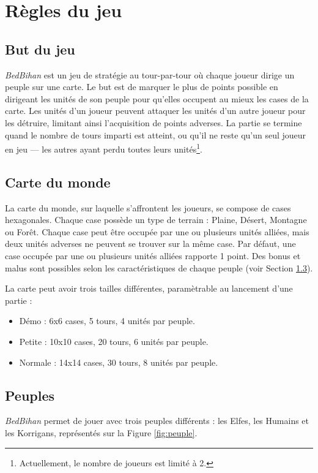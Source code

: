 \newpage
	\section{Règles du jeu}
	\label{sec:regles}

	\subsection{But du jeu}
	\label{subsec:butdujeu}
	\emph{BedBihan} est un jeu de stratégie au tour-par-tour où chaque joueur dirige un peuple sur une carte. Le but est de marquer le plus de points possible en dirigeant les unités de son peuple pour qu'elles occupent au mieux les cases de la carte. Les unités d’un joueur peuvent attaquer les unités d’un autre joueur pour les détruire, limitant ainsi l'acquisition de points adverses. La partie se termine quand le nombre de tours imparti est atteint, ou qu'il ne reste qu'un seul joueur en jeu --- les autres ayant perdu toutes leurs unités\footnote{Actuellement, le nombre de joueurs est limité à 2.}.

	\subsection{Carte du monde}
	\label{subsec:carte}
	La carte du monde, sur laquelle s'affrontent les joueurs, se compose de cases hexagonales. Chaque case possède un type de terrain : Plaine,	Désert, Montagne ou Forêt. Chaque case peut être occupée par une ou plusieurs unités alliées, mais deux unités adverses ne peuvent se trouver sur la même case. Par défaut, une case occupée par une ou plusieurs unités alliées rapporte 1 point. Des bonus et malus sont possibles selon les caractéristiques de chaque peuple (voir Section \ref{subsec:peuples}). 
	
	La carte peut avoir trois tailles différentes, paramètrable au lancement d'une partie :
	\begin{itemize}
		\item Démo : 6x6 cases, 5 tours, 4 unités par peuple.
		\item Petite : 10x10 cases, 20 tours, 6 unités par peuple.
		\item Normale : 14x14 cases, 30 tours, 8 unités par peuple.
	\end{itemize}
	
	
	\subsection{Peuples}
	\label{subsec:peuples}
	\emph{BedBihan} permet de jouer avec trois peuples différents : les Elfes, les Humains et les Korrigans, représentés sur la {\sc Figure }{\ref {fig:peuple}}.
	
